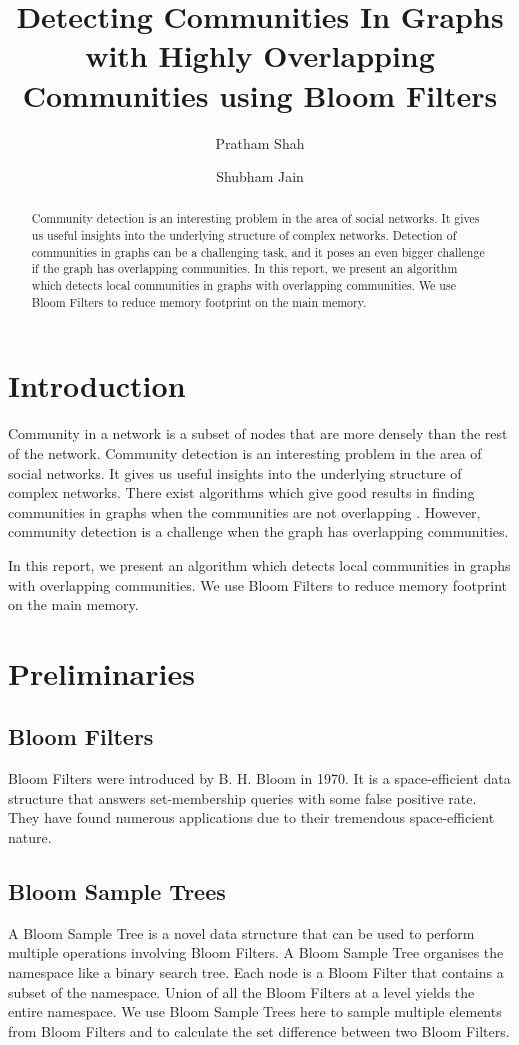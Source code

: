 \documentclass[a4paper]{article}
\title{Detecting Communities In Graphs with Highly Overlapping Communities using Bloom Filters}
\author{Pratham Shah \and Shubham Jain}
\begin{document}
\maketitle

\begin{abstract}
    Community detection is an interesting problem in the area of social networks. It gives us useful insights into the underlying structure of complex networks. Detection of communities in graphs can be a challenging task, and it poses an even bigger challenge if the graph has overlapping communities. In this report, we present an algorithm which detects local communities in graphs with overlapping communities. We use Bloom Filters to reduce memory footprint on the main memory.
\end{abstract}

\section{Introduction}
 Community in a network is a subset of nodes that are more densely than the rest of the network. Community detection is an interesting problem in the area of social networks. It gives us useful insights into the underlying structure of complex networks. There exist algorithms which give good results in finding communities in graphs when the communities are not overlapping \cite{lancichinetti:2008} \cite{PRN}. However, community detection is a challenge when the graph has overlapping communities. 
 
In this report, we present an algorithm which detects local communities in graphs with overlapping communities. We use Bloom Filters to reduce memory footprint on the main memory.


\section{Preliminaries}


\subsection{Bloom Filters}
Bloom Filters \cite{Bloom:1970:STH:362686.362692} were introduced by B. H. Bloom in 1970. It is a space-efficient data structure that answers set-membership queries with some false positive rate. They have found numerous applications due to their tremendous space-efficient nature.

\subsection{Bloom Sample Trees}
A Bloom Sample Tree \cite{sengupta:2017} is a novel data structure that can be used to perform multiple operations involving Bloom Filters. A Bloom Sample Tree organises the namespace like a binary search tree. Each node is a Bloom Filter that contains a subset of the namespace. Union of all the Bloom Filters at a level yields the entire namespace. We use Bloom Sample Trees here to sample multiple elements from Bloom Filters and to calculate the set difference between two Bloom Filters.
\end{document}
